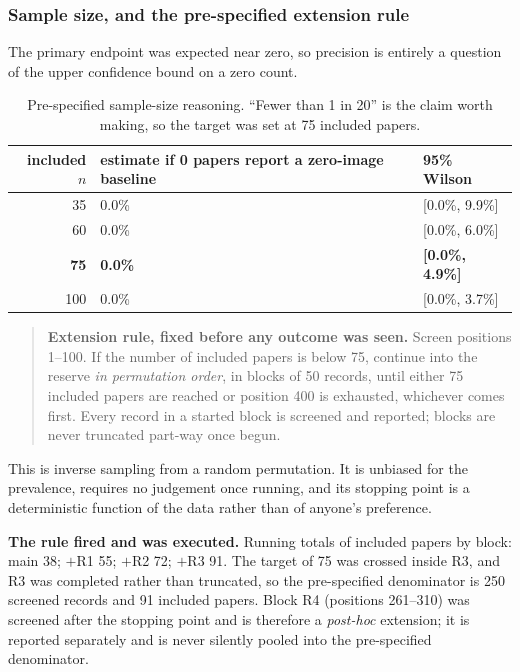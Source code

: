 \documentclass[11pt,a4paper]{article}
\begin{document}
\subsubsection*{Sample size, and the pre-specified extension rule}

The primary endpoint was expected near zero, so precision is entirely a question of
the upper confidence bound on a zero count.

\begin{table}[htbp]
\centering
\caption{Pre-specified sample-size reasoning. ``Fewer than 1 in 20'' is the claim
worth making, so the target was set at 75 included papers.}
\small
\begin{tabular}{@{}rll@{}}
\toprule
included $n$ & estimate if 0 papers report a zero-image baseline & 95\% Wilson \\
\midrule
35  & 0.0\% & [0.0\%, 9.9\%] \\
60  & 0.0\% & [0.0\%, 6.0\%] \\
\textbf{75}  & \textbf{0.0\%} & \textbf{[0.0\%, 4.9\%]} \\
100 & 0.0\% & [0.0\%, 3.7\%] \\
\bottomrule
\end{tabular}
\end{table}

\begin{quote}
\textbf{Extension rule, fixed before any outcome was seen.} Screen positions 1--100.
If the number of included papers is below 75, continue into the reserve \emph{in
permutation order}, in blocks of 50 records, until either 75 included papers are
reached or position 400 is exhausted, whichever comes first. Every record in a
started block is screened and reported; blocks are never truncated part-way once
begun.
\end{quote}

This is inverse sampling from a random permutation. It is unbiased for the
prevalence, requires no judgement once running, and its stopping point is a
deterministic function of the data rather than of anyone's preference.

\textbf{The rule fired and was executed.} Running totals of included papers by block:
main 38; $+$R1 55; $+$R2 72; $+$R3 91. The target of 75 was crossed inside R3, and
R3 was completed rather than truncated, so the pre-specified denominator is 250
screened records and 91 included papers. Block R4 (positions 261--310) was screened
after the stopping point and is therefore a \emph{post-hoc} extension; it is reported
separately and is never silently pooled into the pre-specified denominator.
\end{document}
